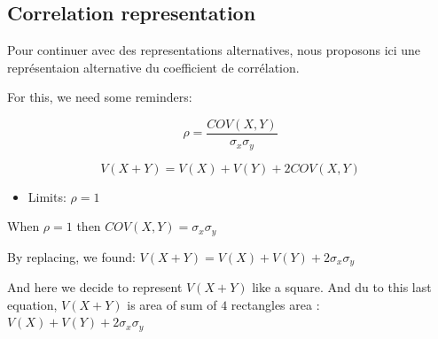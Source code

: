 \documentclass[
]{report}
\providecommand{\tightlist}{%
  \setlength{\itemsep}{0pt}\setlength{\parskip}{0pt}}
\begin{document}
\hypertarget{correlation-representation}{%
\subsection{Correlation representation}\label{correlation-representation}}

Pour continuer avec des representations alternatives, nous proposons ici une représentaion alternative du coefficient de corrélation.

For this, we need some reminders:

\[\rho = \frac{COV(X,Y)}{\sigma_x \sigma_y}\]

\[V(X+Y) = V(X) + V(Y) + 2COV(X,Y)\]

\begin{itemize}
\tightlist
\item
  Limits: \(\rho = 1\)
\end{itemize}

When \(\rho = 1\) then \(COV(X,Y) = \sigma_x \sigma_y\)

By replacing, we found: \(V(X+Y) = V(X) + V(Y) + 2\sigma_x \sigma_y\)

\begin{minipage}{0.60\textwidth}
  \begin{figure}
  \end{figure}
\end{minipage} 
\hspace{3.5ex}
\begin{minipage}{0.35\textwidth}
  And here we decide to represent $V(X+Y)$ like a square. And du to this last equation, $V(X+Y)$ is area of sum of $4$ rectangles area : $V(X) + V(Y) + 2\sigma_x \sigma_y$
\end{minipage}
\end{document}
